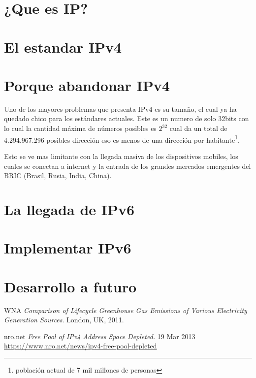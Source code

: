 \documentclass[11pt,a4paper]{article}
\author{Ignacio Perez Laborda}
\begin{document}


\tableofcontents

\listoffigures

\newpage

\section{¿Que es IP?}

\section{El estandar IPv4}

\section{Porque abandonar IPv4}
Uno de los mayores problemas que presenta IPv4 es su tamaño, el cual ya ha quedado chico para los
estándares actuales. Este es un numero de solo 32bits con lo cual la cantidad máxima de números
posibles es $2^{32}$ cual da un total de 4.294.967.296 posibles dirección eso es menos de una
dirección por habitante\footnote{población actual de 7 mil millones de personas}.\par
Esto se ve mas limitante con la llegada masiva de los dispositivos mobiles, los cuales se conectan
a internet y la entrada de los grandes mercados emergentes del BRIC (Brasil, Rusia, India, China).

\section{La llegada de IPv6}
\section{Implementar IPv6}
\section{Desarrollo a futuro}

\newpage
\begin{thebibliography}{9}
  WNA
  \emph{Comparison of Lifecycle Greenhouse Gas Emissions of Various Electricity Generation Sources}.
  London, UK,
  2011.
		
		
 nro.net
 \emph{Free Pool of IPv4 Address Space Depleted.} 
 19 Mar 2013\\
	\url{https://www.nro.net/news/ipv4-free-pool-depleted}		
		
\end{thebibliography}
\end{document}
